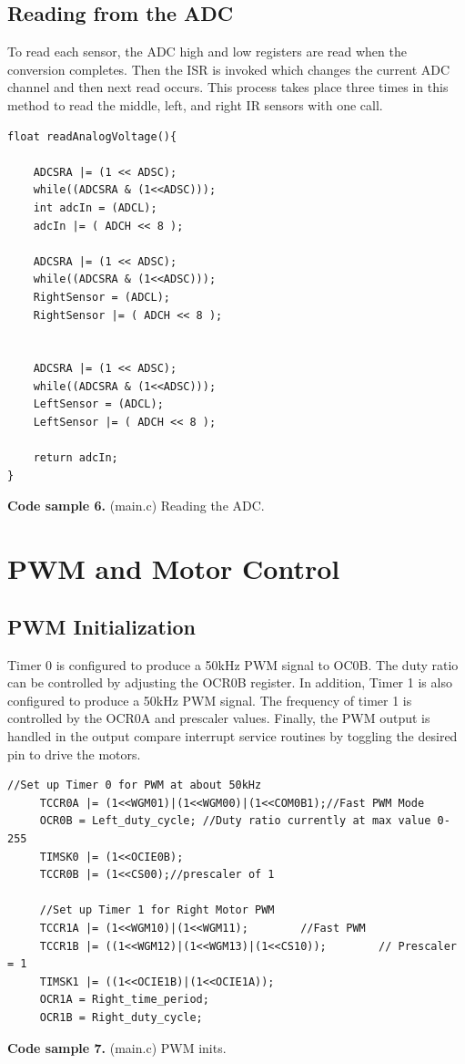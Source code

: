 \documentclass{article}
\begin{document}
\subsection{Reading from the ADC}
To read each sensor, the ADC high and low registers are read when the conversion completes.  Then the ISR is invoked which changes the current ADC channel and then next read occurs.  This process takes place three times in this method to read the middle, left, and right IR sensors with one call.
\begin{lstlisting}
float readAnalogVoltage(){

    ADCSRA |= (1 << ADSC);
    while((ADCSRA & (1<<ADSC)));
    int adcIn = (ADCL);
    adcIn |= ( ADCH << 8 );

    ADCSRA |= (1 << ADSC);
    while((ADCSRA & (1<<ADSC)));
    RightSensor = (ADCL);
    RightSensor |= ( ADCH << 8 );


    ADCSRA |= (1 << ADSC);
    while((ADCSRA & (1<<ADSC)));
    LeftSensor = (ADCL);
    LeftSensor |= ( ADCH << 8 );

    return adcIn;
}

\end{lstlisting}
\textbf{Code sample 6.} (main.c) Reading the ADC.
\section{PWM and Motor Control}
\subsection{PWM Initialization}
Timer 0 is configured to produce a 50kHz PWM signal to OC0B.  The duty ratio can be controlled by adjusting the OCR0B register.  In addition, Timer 1 is also configured to produce a 50kHz PWM signal.  The frequency of timer 1 is controlled by the OCR0A and prescaler values.  Finally, the PWM output is handled in the output compare interrupt service routines by toggling the desired pin to drive the motors.
\begin{lstlisting}
//Set up Timer 0 for PWM at about 50kHz
   	 TCCR0A |= (1<<WGM01)|(1<<WGM00)|(1<<COM0B1);//Fast PWM Mode
   	 OCR0B = Left_duty_cycle; //Duty ratio currently at max value 0-255
   	 TIMSK0 |= (1<<OCIE0B);
   	 TCCR0B |= (1<<CS00);//prescaler of 1

   	 //Set up Timer 1 for Right Motor PWM
   	 TCCR1A |= (1<<WGM10)|(1<<WGM11);   	 //Fast PWM
   	 TCCR1B |= ((1<<WGM12)|(1<<WGM13)|(1<<CS10));   	 // Prescaler = 1
   	 TIMSK1 |= ((1<<OCIE1B)|(1<<OCIE1A));
   	 OCR1A = Right_time_period;
   	 OCR1B = Right_duty_cycle;

\end{lstlisting}
\textbf{Code sample 7.} (main.c) PWM inits.
\end{document}
